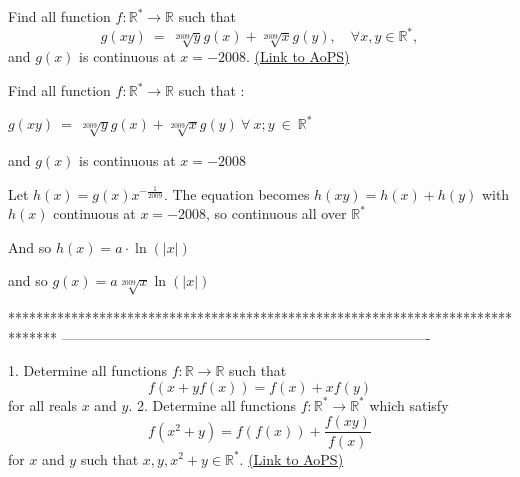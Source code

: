\begin{problem}
	Find all function $ f : \mathbb{R^{*}} \to \mathbb{R}$ such that
\[g(xy) \ = \ \sqrt[2009]{y} g(x) +\sqrt[2009]{x} g(y), \quad \forall  x,y  \in    \mathbb{R^{*}},\]
and $ g(x)$ is continuous at $ x = - 2008$.
	\flushright \href{https://artofproblemsolving.com/community/c6h301286}{(Link to AoPS)}
\end{problem}



\begin{solution}
	\begin{tcolorbox}\begin{italicized}Find all function $ f : \mathbb{R^{*}} \to \mathbb{R}$ such that :

    $ g(xy) \ = \ \sqrt [2009]{y} g(x) + \sqrt [2009]{x} g(y) \ \forall \ x;y \ \in \ \mathbb{R^{*}}$

  and $ g(x)$ is continuous at $ x = - 2008$\end{italicized}\end{tcolorbox}

Let $ h(x)=g(x)x^{-\frac 1{2009}}$. The equation becomes $ h(xy)=h(x)+h(y)$ with $ h(x)$ continuous at $ x = - 2008$, so continuous all over $ \mathbb R^*$

And so $ h(x)=a\cdot\ln(|x|)$

and so $ g(x)=a\sqrt [2009]{x}\ln(|x|)$
\end{solution}
*******************************************************************************
-------------------------------------------------------------------------------

\begin{problem}
	1. Determine all functions $f: \mathbb R \to \mathbb R$ such that \[ f(x+yf(x))=f(x)+xf(y)\] for all reals $x$ and $y$.
2. Determine all functions $ f: \mathbb R^* \to \mathbb R^*$ which satisfy \[ f(x^2+y)=f(f(x))+\frac{f(xy)}{f(x)}\] for $x$ and $y$ such that $x,y,x^2+y \in \mathbb R^*$.
	\flushright \href{https://artofproblemsolving.com/community/c6h301766}{(Link to AoPS)}
\end{problem}



